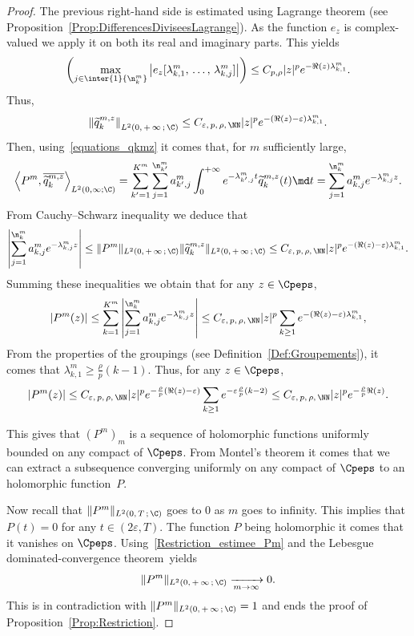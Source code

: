 \begin{proof}
The previous right-hand side is estimated using Lagrange theorem (see Proposition~\ref{Prop:DifferencesDiviseesLagrange}). As the function $e_z$ is complex-valued we apply it on both its real and imaginary parts. This yields
\[
\left(\max_{j\in \inter{1}{\n^m_k}} \left| e_z[\lambda^m_{k,1},\,\dotsc,\,\lambda^m_{k,j}] \right| \right) \leq C_{p,\rho} |z|^p e^{-\Re(z) \lambda^m_{k,1}}.
\]
Thus,
\[
\left\| \widetilde{q}_k^{m,z}\right\|_{L^2(0,\,+\,\infty\,;\,\C)} \leq C_{\varepsilon,\,p,\,\rho,\,\NN} |z|^p e^{-(\Re(z)-\varepsilon) \lambda^m_{k,1}}.
\]
Then, using~\eqref{equations_qkmz} it comes that, for $m$ sufficiently large,
\[
\left\langle P^m, \overline{\widetilde{q}_k^{m,z}} \right\rangle_{L^2(0,\infty; \C)} = \sum_{k'=1}^{K^m} \sum_{j=1}^{\n_{k'}^m} a_{k',j}^m \int_0^{+\infty} e^{-\lambda^m_{k',j} t} \widetilde{q}_k^{m,z}(t) \md t = \sum_{j=1}^{\n_k^m} a_{k,j}^m e^{-\lambda_{k,j}^m z}.
\]
From Cauchy--Schwarz inequality we deduce that
\[
\left| \sum_{j=1}^{\n_k^m} a_{k,j}^m e^{-\lambda_{k,j}^m z} \right| \leq \| P^m \|_{L^2(0,\,+\,\infty\,;\,\C)} \| \widetilde{q}_k^{m,z} \|_{L^2(0,\,+\,\infty\,;\,\C)} \leq C_{\varepsilon,\,p,\,\rho,\,\NN} |z|^p e^{-(\Re(z)-\varepsilon) \lambda^m_{k,1}}.
\]
Summing these inequalities we obtain that for any $z \in \Cpeps$,
\[
|P^m(z)| \leq \sum_{k=1}^{K^m} \left| \sum_{j=1}^{\n_k^m} a_{k,j}^m e^{-\lambda_{k,j}^m z} \right|
\leq C_{\varepsilon,\,p,\,\rho,\,\NN} |z|^p \sum_{k\geq 1} e^{-(\Re(z)-\varepsilon) \lambda^m_{k,1}},
\]
From the properties of the groupings (see Definition~\ref{Def:Groupements}), it comes that $\lambda^m_{k,1} \geq \frac{\rho}{p} (k-1)$. Thus, for any $z \in \Cpeps$,
\begin{equation}\label{Restriction_estimee_Pm}
|P^m(z)|
\leq C_{\varepsilon,\,p,\,\rho,\,\NN} |z|^p e^{-\frac{\rho}{p} (\Re(z)-\varepsilon)} \sum_{k\geq 1} e^{-\varepsilon \frac{\rho}{p} (k-2)}
\leq C_{\varepsilon,\,p,\,\rho,\,\NN} |z|^p e^{-\frac{\rho}{p} \Re(z)}.
\end{equation}

This gives that $(P^m)_m$ is a sequence of holomorphic functions uniformly bounded on any compact of $\Cpeps$. From Montel's theorem it comes that we can extract a subsequence converging uniformly on any compact of $\Cpeps$ to an holomorphic function~$P$.

Now recall that $\|P^m\|_{L^2(0,\,T\,;\,\C)}$ goes to $0$ as $m$ goes to infinity. This implies that $P(t)=0$ for any $t \in (2 \varepsilon, T)$. The function $P$ being holomorphic it comes that it vanishes on $\Cpeps$. Using~\eqref{Restriction_estimee_Pm} and the Lebesgue dominated-convergence theorem~yields
\[
\|P^m\|_{L^2(0,\,+\,\infty\,;\,\C)} \xrightarrow[m\to \infty]{} 0.
\]
This is in contradiction with $\| P^m \|_{L^2(0,\,+\,\infty\,;\,\C)} =1$ and ends the proof of Proposition~\ref{Prop:Restriction}.
\end{proof}


